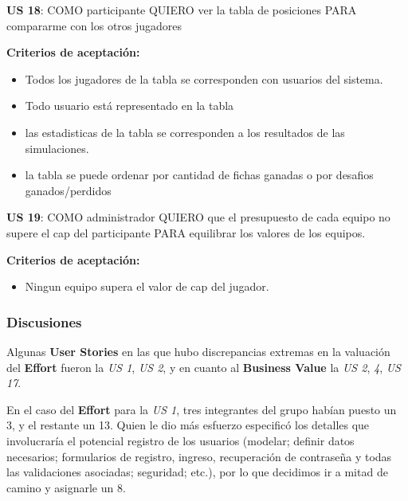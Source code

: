\begin{tcolorbox}
\textbf{US 18}: COMO participante QUIERO ver la tabla de posiciones PARA compararme con los otros jugadores

\vline

\textbf{Criterios de aceptación:}
\begin{itemize}
\item Todos los jugadores de la tabla se corresponden con usuarios del sistema.
\item Todo usuario está representado en la tabla
\item las estadisticas de la tabla se corresponden a los resultados de las simulaciones.
\item la tabla se puede ordenar por cantidad de fichas ganadas o por desafios ganados/perdidos
\end{itemize}
\end{tcolorbox}
\vspace{10pt}

\begin{tcolorbox}
\textbf{US 19}: COMO administrador QUIERO que el presupuesto de cada equipo no supere el cap del participante PARA equilibrar los valores de los equipos.

\vline

\textbf{Criterios de aceptación:}
\begin{itemize}
\item Ningun equipo supera el valor de cap del jugador.
\end{itemize}
\end{tcolorbox}
\vspace{10pt}


\subsubsection*{Discusiones}
Algunas \textbf{User Stories} en las que hubo discrepancias extremas en la valuación del \textbf{Effort} fueron la \emph{US 1}, \emph{US 2}, y en cuanto al \textbf{Business Value} la \emph{US 2}, \emph{4}, \emph{US 17}.

En el caso del \textbf{Effort} para la \emph{US 1}, tres integrantes del grupo habían puesto un 3, y el restante un 13. Quien le dio más esfuerzo especificó los detalles que involucraría el potencial registro de los usuarios (modelar; definir datos necesarios; formularios de registro, ingreso, recuperación de contraseña y todas las validaciones asociadas; seguridad; etc.), por lo que decidimos ir a mitad de camino y asignarle un 8.

